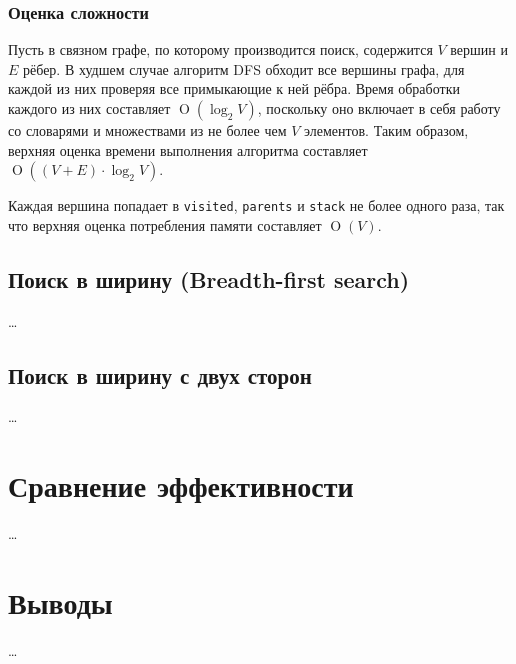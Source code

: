 \documentclass[a4paper, 12pt]{article}
\begin{document}
\subsubsection{Оценка сложности}
Пусть в связном графе, по которому производится поиск, содержится \({ V }\) вершин и \({ E }\) рёбер. В худшем случае алгоритм DFS обходит все вершины графа, для каждой из них проверяя все примыкающие к ней рёбра. Время обработки каждого из них составляет \({ \operatorname{O}(\log_2 V) }\), поскольку оно включает в себя работу со словарями и множествами из не более чем \({ V }\) элементов. Таким образом, верхняя оценка времени выполнения алгоритма составляет \({ \operatorname{O}((V + E) \cdot \log_2 V) }\).

Каждая вершина попадает в \verb|visited|, \verb|parents| и \verb|stack| не более одного раза, так что верхняя оценка потребления памяти составляет \({ \operatorname{O}(V) }\).

\subsection{Поиск в ширину (Breadth-first search)}
\ldots

\subsection{Поиск в ширину с двух сторон}
\ldots

\section{Сравнение эффективности}
\ldots

\section{Выводы}
\ldots
\end{document}
